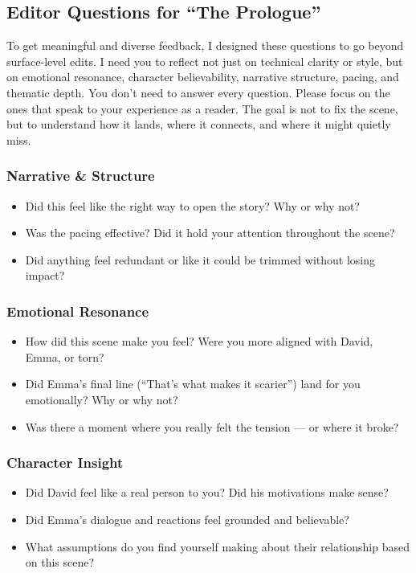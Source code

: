 \subsection*{Editor Questions for ``The Prologue''}

To get meaningful and diverse feedback, I designed these questions to go beyond surface-level edits. 
I need you to reflect not just on technical clarity or style, but on emotional resonance, character 
believability, narrative structure, pacing, and thematic depth. You don’t need to answer every question. 
Please focus on the ones that speak to your experience as a reader. The goal is not to fix the scene, but 
to understand how it lands, where it connects, and where it might quietly miss.


\subsubsection{Narrative \& Structure}

\begin{itemize}
  \item Did this feel like the right way to open the story? Why or why not?
  \item Was the pacing effective? Did it hold your attention throughout the scene?
  \item Did anything feel redundant or like it could be trimmed without losing impact?
\end{itemize}

\subsubsection{Emotional Resonance}

\begin{itemize}
  \item How did this scene make you feel? Were you more aligned with David, Emma, or torn?
  \item Did Emma’s final line (“That’s what makes it scarier”) land for you emotionally? Why or why not?
  \item Was there a moment where you really felt the tension — or where it broke?
\end{itemize}

\subsubsection{Character Insight}

\begin{itemize}
  \item Did David feel like a real person to you? Did his motivations make sense?
  \item Did Emma’s dialogue and reactions feel grounded and believable?
  \item What assumptions do you find yourself making about their relationship based on this scene?
\end{itemize}

